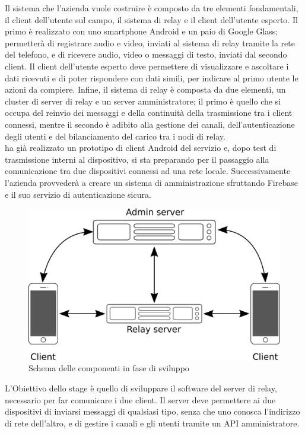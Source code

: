    Il sistema che l'azienda vuole costruire è composto da tre elementi fondamentali, il client dell'utente sul campo, il sistema di relay e il client dell'utente esperto. Il primo è realizzato con uno smartphone Android e un paio di Google Glass; permetterà di registrare audio e video, inviati al sistema di relay tramite la rete del telefono, e di ricevere audio, video o messaggi di testo, inviati dal secondo client. Il client dell'utente esperto deve permettere di visualizzare e ascoltare i dati ricevuti e di poter rispondere con dati simili, per indicare al primo utente le azioni da compiere. Infine, il sistema di relay è composta da due elementi, un cluster di server di relay e un server amministratore; il primo è quello che si occupa del reinvio dei messaggi e della continuità della trasmissione tra i client connessi, mentre il secondo è adibito alla gestione dei canali, dell'autenticazione degli utenti e del bilanciamento del carico tra i nodi di relay.
   \\
   \nomeAzienda{} ha già realizzato un prototipo di client Android del servizio e, dopo test di trasmissione interni al dispositivo, si sta preparando per il passaggio alla comunicazione tra due dispositivi connessi ad una rete locale. Successivamente l'azienda provvederà a creare un sistema di amministrazione sfruttando Firebase e il suo servizio di autenticazione sicura.
   \begin{figure}[H]
      \begin{center}
         \includegraphics[width=12cm,keepaspectratio]{immagini/erastreaming-schema-attuale}
      \end{center}
      \caption{Schema delle componenti in fase di sviluppo}
   \end{figure}
   L'Obiettivo dello stage è quello di sviluppare il software del server di relay, necessario per far comunicare i due client. Il server deve permettere ai due dispositivi di inviarsi messaggi di qualsiasi tipo, senza che uno conosca l'indirizzo di rete dell'altro, e di gestire i canali e gli utenti tramite un API amministratore.
   
